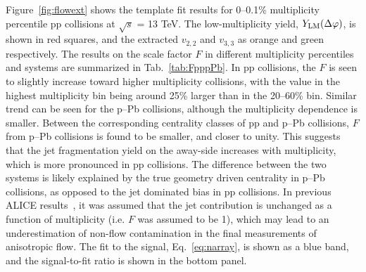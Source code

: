 Figure~\ref{fig:flowext} shows the template fit results for 0--0.1\% multiplicity percentile pp collisions at $\sqrt{s}$ = 13 TeV. The low-multiplicity yield,  $Y_{\rm{LM}}(\Delta\varphi)$, is shown in red squares, and the extracted $v_{2,2}$ and $v_{3,3}$ as orange and green respectively. The results on the scale factor $F$ in different multiplicity percentiles and systems are summarized in Tab.~\ref{tab:FpppPb}. In pp collisions, the $F$ is seen to slightly increase toward higher multiplicity collisions, with the value in the highest multiplicity bin being around 25\% larger than in the 20--60\% bin. Similar trend can be seen for the p--Pb collisions, although the multiplicity dependence is smaller. Between the corresponding centrality classes of pp and p--Pb collisions, $F$ from p--Pb collisions is found to be smaller, and closer to unity.
This suggests that the jet fragmentation yield on the away-side increases with multiplicity, which is more pronounced in pp collisions. The difference between the two systems is likely explained by the true geometry driven centrality in p--Pb collisions, as opposed to the jet dominated bias in pp collisions.
 In previous ALICE results~\cite{ALICE:2012eyl,ALICE:2013snk}, it was assumed that the jet contribution is unchanged as a function of multiplicity (i.e. $F$ was assumed to be 1), which may lead to an underestimation of non-flow contamination in the final measurements of anisotropic flow. 
 The fit to the signal, Eq.~\ref{eq:narray}, is shown as a blue band, and the signal-to-fit ratio is shown in the bottom panel. 
\begin{table}[h!]
\caption{The scale factor $F$ for various multiplicity percentiles in pp (top) and p--Pb (bottom) collisions.}
\centering
{}
\label{tab:FpppPb}
\end{table}

